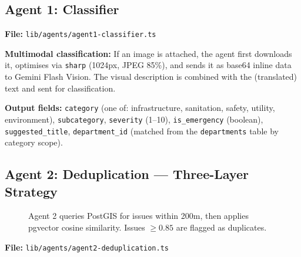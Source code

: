 \documentclass[11pt,a4paper]{article}
\newcommand{\tech}[1]{\texttt{\color{cpteal}#1}}
\newcommand{\file}[1]{\texttt{\footnotesize\color{cpgray}#1}}
\begin{document}
\subsection{Agent 1: Classifier}
\label{sec:agent1}
\textbf{File:} \file{lib/agents/agent1-classifier.ts}

\textbf{Multimodal classification:} If an image is attached, the agent first downloads it, optimises via \tech{sharp} (1024px, JPEG 85\%), and sends it as base64 inline data to Gemini Flash Vision. The visual description is combined with the (translated) text and sent for classification.

\textbf{Output fields:} \tech{category} (one of: infrastructure, sanitation, safety, utility, environment), \tech{subcategory}, \tech{severity} (1–10), \tech{is\_emergency} (boolean), \tech{suggested\_title}, \tech{department\_id} (matched from the \tech{departments} table by category scope).

\subsection{Agent 2: Deduplication — Three-Layer Strategy}

\begin{figure}[H]
\centering
{}
\caption{Agent 2 queries PostGIS for issues within 200m, then applies pgvector cosine similarity. Issues $\ge 0.85$ are flagged as duplicates.}
\end{figure}
\label{sec:agent2}
\textbf{File:} \file{lib/agents/agent2-deduplication.ts}
\end{document}
